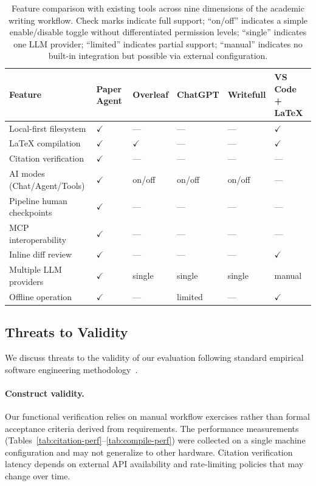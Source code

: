 \begin{table}[htbp]
  \centering
  \caption{Feature comparison with existing tools across nine dimensions
  of the academic writing workflow. Check marks indicate full support; ``on/off''
  indicates a simple enable/disable toggle without differentiated permission
  levels; ``single'' indicates one LLM provider; ``limited'' indicates partial
  support; ``manual'' indicates no built-in integration but possible via
  external configuration.}
  \label{tab:comparison}
  \footnotesize
  \begin{tabularx}{\textwidth}{L{3.6cm} *{5}{L{2.0cm}}}
    \toprule
    \textbf{Feature} & \textbf{Paper Agent} & \textbf{Overleaf} &
    \textbf{ChatGPT} & \textbf{Writefull} & \textbf{VS Code + \LaTeX{}} \\
    \midrule
    Local-first filesystem & $\checkmark$ & --- & --- & --- & $\checkmark$ \\
    \LaTeX{} compilation & $\checkmark$ & $\checkmark$ & --- & --- & $\checkmark$ \\
    Citation verification & $\checkmark$ & --- & --- & --- & --- \\
    AI modes (Chat/Agent/Tools) & $\checkmark$ & on/off & on/off & on/off & --- \\
    Pipeline human checkpoints & $\checkmark$ & --- & --- & --- & --- \\
    MCP interoperability & $\checkmark$ & --- & --- & --- & --- \\
    Inline diff review & $\checkmark$ & --- & --- & --- & $\checkmark$ \\
    Multiple LLM providers & $\checkmark$ & single & single & single & manual \\
    Offline operation & $\checkmark$ & --- & limited & --- & $\checkmark$ \\
    \bottomrule
  \end{tabularx}
\end{table}

\subsection{Threats to Validity}

We discuss threats to the validity of our evaluation following standard
empirical software engineering methodology~\cite{wohlin2014experimentation}.

\paragraph{Construct validity.}
Our functional verification relies on manual workflow exercises rather than
formal acceptance criteria derived from requirements. The performance
measurements (Tables~\ref{tab:citation-perf}--\ref{tab:compile-perf}) were
collected on a single machine configuration and may not generalize to other
hardware. Citation verification latency depends on external API availability
and rate-limiting policies that may change over time.

